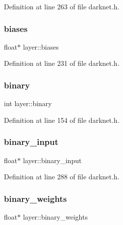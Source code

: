 Definition at line 263 of file darknet.\+h.

\mbox{\label{structlayer_aaa7f20cb294d09ee0011d32658675a48}} 
\subsubsection{\texorpdfstring{biases}{biases}}
{\footnotesize\ttfamily float$\ast$ layer\+::biases}



Definition at line 231 of file darknet.\+h.

\mbox{\label{structlayer_a7a6777b89f1faa3ec8dbc9d6fd2b431b}} 
\subsubsection{\texorpdfstring{binary}{binary}}
{\footnotesize\ttfamily int layer\+::binary}



Definition at line 154 of file darknet.\+h.

\mbox{\label{structlayer_a65b3a401a9e02fc7b7260705ade1b317}} 
\subsubsection{\texorpdfstring{binary\_input}{binary\_input}}
{\footnotesize\ttfamily float$\ast$ layer\+::binary\+\_\+input}



Definition at line 288 of file darknet.\+h.

\mbox{\label{structlayer_a105fc98c2adbd8d8de839e327fb284b7}} 
\subsubsection{\texorpdfstring{binary\_weights}{binary\_weights}}
{\footnotesize\ttfamily float$\ast$ layer\+::binary\+\_\+weights}



